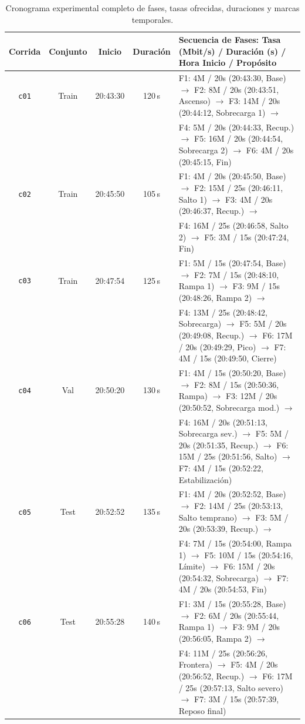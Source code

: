 \documentclass[11pt,a4paper]{article}
\begin{document}
\begin{table}[H]
\centering
\scriptsize
\caption{Cronograma experimental completo de fases, tasas ofrecidas, duraciones y marcas temporales.}
\label{tab:diseno_corridas}
\begin{tabularx}{\textwidth}{ccccX}
\toprule
\textbf{Corrida} & \textbf{Conjunto} & \textbf{Inicio} & \textbf{Duración} & \textbf{Secuencia de Fases: Tasa (Mbit/s) / Duración (s) / Hora Inicio / Propósito} \\
\midrule
\texttt{c01} & Train & 20:43:30 & 120\,s & 
F1: 4M / 20s (20:43:30, Base) $\to$ F2: 8M / 20s (20:43:51, Ascenso) $\to$ F3: 14M / 20s (20:44:12, Sobrecarga 1) $\to$ \\
 & & & & F4: 5M / 20s (20:44:33, Recup.) $\to$ F5: 16M / 20s (20:44:54, Sobrecarga 2) $\to$ F6: 4M / 20s (20:45:15, Fin) \\
\midrule
\texttt{c02} & Train & 20:45:50 & 105\,s & 
F1: 4M / 20s (20:45:50, Base) $\to$ F2: 15M / 25s (20:46:11, Salto 1) $\to$ F3: 4M / 20s (20:46:37, Recup.) $\to$ \\
 & & & & F4: 16M / 25s (20:46:58, Salto 2) $\to$ F5: 3M / 15s (20:47:24, Fin) \\
\midrule
\texttt{c03} & Train & 20:47:54 & 125\,s & 
F1: 5M / 15s (20:47:54, Base) $\to$ F2: 7M / 15s (20:48:10, Rampa 1) $\to$ F3: 9M / 15s (20:48:26, Rampa 2) $\to$ \\
 & & & & F4: 13M / 25s (20:48:42, Sobrecarga) $\to$ F5: 5M / 20s (20:49:08, Recup.) $\to$ F6: 17M / 20s (20:49:29, Pico) $\to$ F7: 4M / 15s (20:49:50, Cierre) \\
\midrule
\texttt{c04} & Val & 20:50:20 & 130\,s & 
F1: 4M / 15s (20:50:20, Base) $\to$ F2: 8M / 15s (20:50:36, Rampa) $\to$ F3: 12M / 20s (20:50:52, Sobrecarga mod.) $\to$ \\
 & & & & F4: 16M / 20s (20:51:13, Sobrecarga sev.) $\to$ F5: 5M / 20s (20:51:35, Recup.) $\to$ F6: 15M / 25s (20:51:56, Salto) $\to$ F7: 4M / 15s (20:52:22, Estabilización) \\
\midrule
\texttt{c05} & Test & 20:52:52 & 135\,s & 
F1: 4M / 20s (20:52:52, Base) $\to$ F2: 14M / 25s (20:53:13, Salto temprano) $\to$ F3: 5M / 20s (20:53:39, Recup.) $\to$ \\
 & & & & F4: 7M / 15s (20:54:00, Rampa 1) $\to$ F5: 10M / 15s (20:54:16, Límite) $\to$ F6: 15M / 20s (20:54:32, Sobrecarga) $\to$ F7: 4M / 20s (20:54:53, Fin) \\
\midrule
\texttt{c06} & Test & 20:55:28 & 140\,s & 
F1: 3M / 15s (20:55:28, Base) $\to$ F2: 6M / 20s (20:55:44, Rampa 1) $\to$ F3: 9M / 20s (20:56:05, Rampa 2) $\to$ \\
 & & & & F4: 11M / 25s (20:56:26, Frontera) $\to$ F5: 4M / 20s (20:56:52, Recup.) $\to$ F6: 17M / 25s (20:57:13, Salto severo) $\to$ F7: 3M / 15s (20:57:39, Reposo final) \\
\bottomrule
\end{tabularx}
\end{table}
\end{document}
